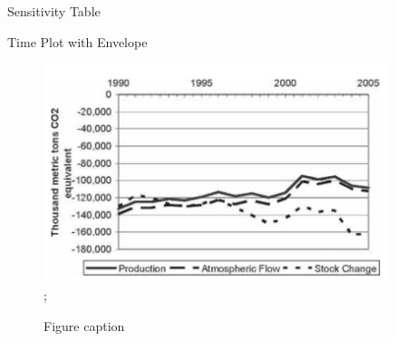 \documentclass[final]{beamer}\usepackage[]{graphicx}\usepackage[]{color}
\newlength{\sepwid}
\newlength{\onecolwid}
\newlength{\twocolwid}
\begin{document}
\begin{frame}[t]
\begin{columns}[t]
\begin{column}{\twocolwid}
\begin{columns}[t,totalwidth=\twocolwid]
\begin{column}{\onecolwid}
\end{column} %

\begin{column}{\onecolwid} %


\begin{block}{Sensitivity Table}


\end{block}
\begin{block}{Time Plot with Envelope}
\begin{center}

\begin{figure}
    {\includegraphics[width=1\linewidth]{graph1.png}};
    \caption{Figure caption}
\end{figure}
\end{center}

\end{block}

\end{column} %

\end{columns} %

\end{column} %

\begin{column}{\sepwid}\end{column} %


\end{columns}
\end{frame}
\end{document}
